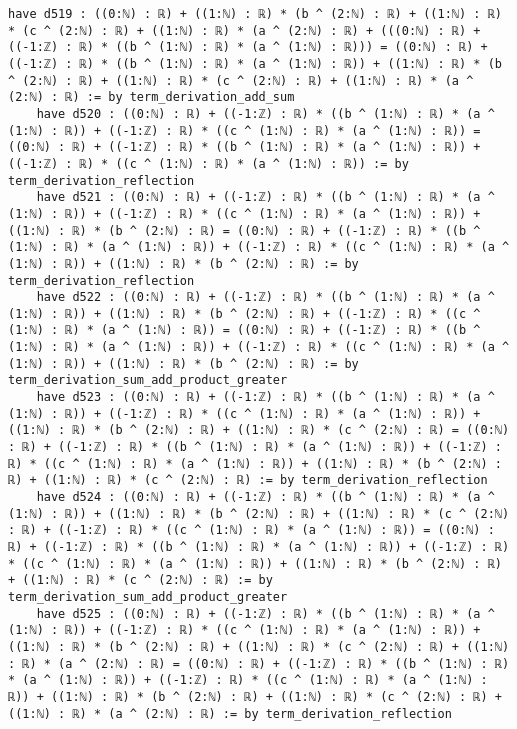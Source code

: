 \documentclass{article}
\begin{document}
\begin{tcolorbox}[colback=white!10, width=\linewidth]
\begin{lstlisting}[language=Lean4]
    have d519 : ((0:ℕ) : ℝ) + ((1:ℕ) : ℝ) * (b ^ (2:ℕ) : ℝ) + ((1:ℕ) : ℝ) * (c ^ (2:ℕ) : ℝ) + ((1:ℕ) : ℝ) * (a ^ (2:ℕ) : ℝ) + (((0:ℕ) : ℝ) + ((-1:ℤ) : ℝ) * ((b ^ (1:ℕ) : ℝ) * (a ^ (1:ℕ) : ℝ))) = ((0:ℕ) : ℝ) + ((-1:ℤ) : ℝ) * ((b ^ (1:ℕ) : ℝ) * (a ^ (1:ℕ) : ℝ)) + ((1:ℕ) : ℝ) * (b ^ (2:ℕ) : ℝ) + ((1:ℕ) : ℝ) * (c ^ (2:ℕ) : ℝ) + ((1:ℕ) : ℝ) * (a ^ (2:ℕ) : ℝ) := by term_derivation_add_sum
    have d520 : ((0:ℕ) : ℝ) + ((-1:ℤ) : ℝ) * ((b ^ (1:ℕ) : ℝ) * (a ^ (1:ℕ) : ℝ)) + ((-1:ℤ) : ℝ) * ((c ^ (1:ℕ) : ℝ) * (a ^ (1:ℕ) : ℝ)) = ((0:ℕ) : ℝ) + ((-1:ℤ) : ℝ) * ((b ^ (1:ℕ) : ℝ) * (a ^ (1:ℕ) : ℝ)) + ((-1:ℤ) : ℝ) * ((c ^ (1:ℕ) : ℝ) * (a ^ (1:ℕ) : ℝ)) := by term_derivation_reflection
    have d521 : ((0:ℕ) : ℝ) + ((-1:ℤ) : ℝ) * ((b ^ (1:ℕ) : ℝ) * (a ^ (1:ℕ) : ℝ)) + ((-1:ℤ) : ℝ) * ((c ^ (1:ℕ) : ℝ) * (a ^ (1:ℕ) : ℝ)) + ((1:ℕ) : ℝ) * (b ^ (2:ℕ) : ℝ) = ((0:ℕ) : ℝ) + ((-1:ℤ) : ℝ) * ((b ^ (1:ℕ) : ℝ) * (a ^ (1:ℕ) : ℝ)) + ((-1:ℤ) : ℝ) * ((c ^ (1:ℕ) : ℝ) * (a ^ (1:ℕ) : ℝ)) + ((1:ℕ) : ℝ) * (b ^ (2:ℕ) : ℝ) := by term_derivation_reflection
    have d522 : ((0:ℕ) : ℝ) + ((-1:ℤ) : ℝ) * ((b ^ (1:ℕ) : ℝ) * (a ^ (1:ℕ) : ℝ)) + ((1:ℕ) : ℝ) * (b ^ (2:ℕ) : ℝ) + ((-1:ℤ) : ℝ) * ((c ^ (1:ℕ) : ℝ) * (a ^ (1:ℕ) : ℝ)) = ((0:ℕ) : ℝ) + ((-1:ℤ) : ℝ) * ((b ^ (1:ℕ) : ℝ) * (a ^ (1:ℕ) : ℝ)) + ((-1:ℤ) : ℝ) * ((c ^ (1:ℕ) : ℝ) * (a ^ (1:ℕ) : ℝ)) + ((1:ℕ) : ℝ) * (b ^ (2:ℕ) : ℝ) := by term_derivation_sum_add_product_greater
    have d523 : ((0:ℕ) : ℝ) + ((-1:ℤ) : ℝ) * ((b ^ (1:ℕ) : ℝ) * (a ^ (1:ℕ) : ℝ)) + ((-1:ℤ) : ℝ) * ((c ^ (1:ℕ) : ℝ) * (a ^ (1:ℕ) : ℝ)) + ((1:ℕ) : ℝ) * (b ^ (2:ℕ) : ℝ) + ((1:ℕ) : ℝ) * (c ^ (2:ℕ) : ℝ) = ((0:ℕ) : ℝ) + ((-1:ℤ) : ℝ) * ((b ^ (1:ℕ) : ℝ) * (a ^ (1:ℕ) : ℝ)) + ((-1:ℤ) : ℝ) * ((c ^ (1:ℕ) : ℝ) * (a ^ (1:ℕ) : ℝ)) + ((1:ℕ) : ℝ) * (b ^ (2:ℕ) : ℝ) + ((1:ℕ) : ℝ) * (c ^ (2:ℕ) : ℝ) := by term_derivation_reflection
    have d524 : ((0:ℕ) : ℝ) + ((-1:ℤ) : ℝ) * ((b ^ (1:ℕ) : ℝ) * (a ^ (1:ℕ) : ℝ)) + ((1:ℕ) : ℝ) * (b ^ (2:ℕ) : ℝ) + ((1:ℕ) : ℝ) * (c ^ (2:ℕ) : ℝ) + ((-1:ℤ) : ℝ) * ((c ^ (1:ℕ) : ℝ) * (a ^ (1:ℕ) : ℝ)) = ((0:ℕ) : ℝ) + ((-1:ℤ) : ℝ) * ((b ^ (1:ℕ) : ℝ) * (a ^ (1:ℕ) : ℝ)) + ((-1:ℤ) : ℝ) * ((c ^ (1:ℕ) : ℝ) * (a ^ (1:ℕ) : ℝ)) + ((1:ℕ) : ℝ) * (b ^ (2:ℕ) : ℝ) + ((1:ℕ) : ℝ) * (c ^ (2:ℕ) : ℝ) := by term_derivation_sum_add_product_greater
    have d525 : ((0:ℕ) : ℝ) + ((-1:ℤ) : ℝ) * ((b ^ (1:ℕ) : ℝ) * (a ^ (1:ℕ) : ℝ)) + ((-1:ℤ) : ℝ) * ((c ^ (1:ℕ) : ℝ) * (a ^ (1:ℕ) : ℝ)) + ((1:ℕ) : ℝ) * (b ^ (2:ℕ) : ℝ) + ((1:ℕ) : ℝ) * (c ^ (2:ℕ) : ℝ) + ((1:ℕ) : ℝ) * (a ^ (2:ℕ) : ℝ) = ((0:ℕ) : ℝ) + ((-1:ℤ) : ℝ) * ((b ^ (1:ℕ) : ℝ) * (a ^ (1:ℕ) : ℝ)) + ((-1:ℤ) : ℝ) * ((c ^ (1:ℕ) : ℝ) * (a ^ (1:ℕ) : ℝ)) + ((1:ℕ) : ℝ) * (b ^ (2:ℕ) : ℝ) + ((1:ℕ) : ℝ) * (c ^ (2:ℕ) : ℝ) + ((1:ℕ) : ℝ) * (a ^ (2:ℕ) : ℝ) := by term_derivation_reflection

\end{lstlisting}
\end{tcolorbox}
\end{document}

